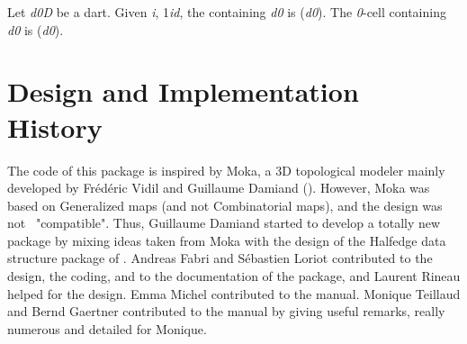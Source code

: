 Let \emph{d0}\myin{}\emph{D} be a dart. Given \emph{i}, 1\myleq{}\emph{i}\myleq{}\emph{d},
the  containing \emph{d0} is 
\orbit{\betaun{},\myldots{},\betaimun{},\betaipun{},\myldots{},\betad{}}(\emph{d0}).
The \emph{0}-cell  containing \emph{d0} is 
(\emph{d0}).

\section{Design and Implementation History}
%
The code of this package is inspired by Moka, a 3D topological modeler
mainly developed by Fr\'ed\'eric Vidil and Guillaume Damiand
().
However, Moka was based on Generalized maps (and not Combinatorial
maps), and the design was not \cgal\ "compatible". Thus, Guillaume
Damiand started to develop a totally new package by mixing ideas taken
from Moka with the design of the Halfedge data structure package of
\cgal.  Andreas Fabri and S\'ebastien Loriot contributed to the
design, the coding, and to the documentation of the package, and
Laurent Rineau helped for the design. Emma Michel contributed to the
manual. Monique Teillaud and Bernd Gaertner contributed to the manual
by giving useful remarks, really numerous and detailed for Monique.
